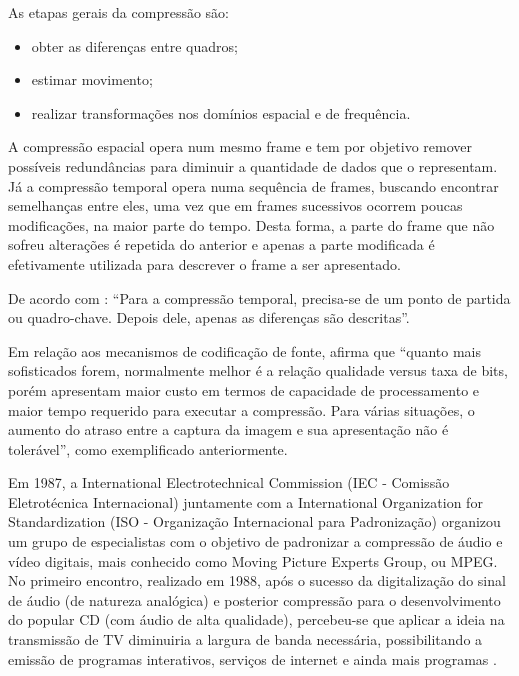 As etapas gerais da compressão são:

\begin{itemize}
	\item obter as diferenças entre quadros;
	\item estimar movimento;
	\item realizar transformações nos domínios espacial e de frequência.
\end{itemize}

A compressão espacial opera num mesmo frame e tem por objetivo remover possíveis redundâncias para diminuir a quantidade de dados que o representam. Já a compressão temporal opera numa sequência de frames, buscando encontrar semelhanças entre eles, uma vez que em frames sucessivos ocorrem poucas modificações, na maior parte do tempo. Desta forma, a parte do frame que não sofreu alterações é repetida do anterior e apenas a parte modificada é efetivamente utilizada para descrever o frame a ser apresentado.

De acordo com \cite{rehme}: “Para a compressão temporal, precisa-se de um ponto de partida ou quadro-chave. Depois dele, apenas as diferenças são descritas”.

Em relação aos mecanismos de codificação de fonte, \cite{rehme} afirma que “quanto mais sofisticados forem, normalmente melhor é a relação qualidade versus taxa de bits, porém apresentam maior custo em termos de capacidade de processamento e maior tempo requerido para executar a compressão. Para várias situações, o aumento do atraso entre a captura da imagem e sua apresentação não é tolerável”, como exemplificado anteriormente.

Em 1987, a International Electrotechnical Commission (IEC - Comissão Eletrotécnica Internacional) juntamente com a International Organization for Standardization (ISO - Organização Internacional para Padronização) organizou um grupo de especialistas com o objetivo de padronizar a compressão de áudio e vídeo digitais, mais conhecido como Moving Picture Experts Group, ou MPEG. No primeiro encontro, realizado em 1988, após o sucesso da digitalização do sinal de áudio (de natureza analógica) e posterior compressão para o desenvolvimento do popular CD (com áudio de alta qualidade), percebeu-se que aplicar a ideia na transmissão de TV diminuiria a largura de banda necessária, possibilitando a emissão de programas interativos, serviços de internet e ainda mais programas \cite{mpeg2ref}.

